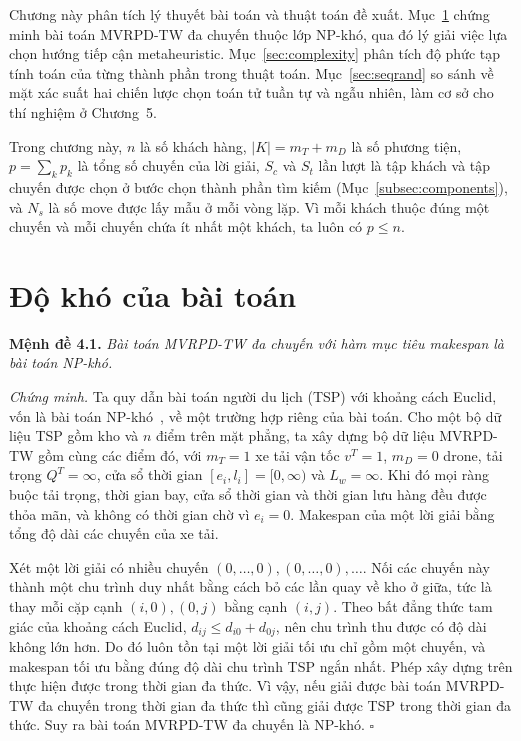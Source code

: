 \documentclass[../DoAn.tex]{subfiles}
\begin{document}
Chương này phân tích lý thuyết bài toán và thuật toán đề xuất. Mục~\ref{sec:nphard} chứng minh bài toán MVRPD-TW đa chuyến thuộc lớp NP-khó, qua đó lý giải việc lựa chọn hướng tiếp cận metaheuristic. Mục~\ref{sec:complexity} phân tích độ phức tạp tính toán của từng thành phần trong thuật toán. Mục~\ref{sec:seqrand} so sánh về mặt xác suất hai chiến lược chọn toán tử tuần tự và ngẫu nhiên, làm cơ sở cho thí nghiệm ở Chương~5.

Trong chương này, $n$ là số khách hàng, $|K| = m_T + m_D$ là số phương tiện, $p = \sum_{k} p_k$ là tổng số chuyến của lời giải, $S_c$ và $S_t$ lần lượt là tập khách và tập chuyến được chọn ở bước chọn thành phần tìm kiếm (Mục~\ref{subsec:components}), và $N_s$ là số move được lấy mẫu ở mỗi vòng lặp. Vì mỗi khách thuộc đúng một chuyến và mỗi chuyến chứa ít nhất một khách, ta luôn có $p \leq n$.

\section{Độ khó của bài toán}
\label{sec:nphard}

\textbf{Mệnh đề 4.1.} \textit{Bài toán MVRPD-TW đa chuyến với hàm mục tiêu makespan là bài toán NP-khó.}

\textit{Chứng minh.} Ta quy dẫn bài toán người du lịch (TSP) với khoảng cách Euclid, vốn là bài toán NP-khó~\cite{lenstra1981complexity}, về một trường hợp riêng của bài toán. Cho một bộ dữ liệu TSP gồm kho và $n$ điểm trên mặt phẳng, ta xây dựng bộ dữ liệu MVRPD-TW gồm cùng các điểm đó, với $m_T = 1$ xe tải vận tốc $v^T = 1$, $m_D = 0$ drone, tải trọng $Q^T = \infty$, cửa sổ thời gian $[e_i, l_i] = [0, \infty)$ và $L_w = \infty$. Khi đó mọi ràng buộc tải trọng, thời gian bay, cửa sổ thời gian và thời gian lưu hàng đều được thỏa mãn, và không có thời gian chờ vì $e_i = 0$. Makespan của một lời giải bằng tổng độ dài các chuyến của xe tải.

Xét một lời giải có nhiều chuyến $(0, \ldots, 0), (0, \ldots, 0), \ldots$. Nối các chuyến này thành một chu trình duy nhất bằng cách bỏ các lần quay về kho ở giữa, tức là thay mỗi cặp cạnh $(i, 0), (0, j)$ bằng cạnh $(i, j)$. Theo bất đẳng thức tam giác của khoảng cách Euclid, $d_{ij} \leq d_{i0} + d_{0j}$, nên chu trình thu được có độ dài không lớn hơn. Do đó luôn tồn tại một lời giải tối ưu chỉ gồm một chuyến, và makespan tối ưu bằng đúng độ dài chu trình TSP ngắn nhất. Phép xây dựng trên thực hiện được trong thời gian đa thức. Vì vậy, nếu giải được bài toán MVRPD-TW đa chuyến trong thời gian đa thức thì cũng giải được TSP trong thời gian đa thức. Suy ra bài toán MVRPD-TW đa chuyến là NP-khó. $\square$
\end{document}
